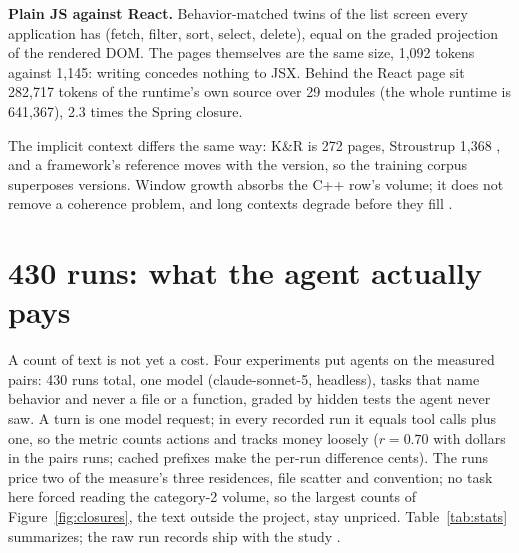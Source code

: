 \documentclass[journal]{IEEEtran}
\begin{document}
\textbf{Plain JS against React.} Behavior-matched twins of the list
screen every application has (fetch, filter, sort, select, delete),
equal on the graded projection of the rendered DOM. The pages
themselves are the same size, 1,092 tokens against 1,145: writing
concedes nothing to JSX. Behind the React page sit 282,717 tokens of
the runtime's own source over 29 modules (the whole runtime is
641,367), 2.3 times the Spring closure.

The implicit context differs the same way: K\&R is 272 pages,
Stroustrup 1,368 \cite{knr,stroustrup}, and a framework's reference
moves with the version, so the training corpus superposes versions.
Window growth absorbs the C++ row's volume; it does not remove a
coherence problem, and long contexts degrade before they fill
\cite{lostmiddle}.

\section*{430 runs: what the agent actually pays}

A count of text is not yet a cost. Four experiments put agents on the
measured pairs: 430 runs total, one model (claude-sonnet-5, headless),
tasks that name behavior and never a file or a function, graded by
hidden tests the agent never saw. A turn is one model request; in every
recorded run it equals tool calls plus one, so the metric counts
actions and tracks money loosely ($r = 0.70$ with dollars in the pairs
runs; cached prefixes make the per-run difference cents). The
runs price two of the measure's three residences, file scatter and
convention; no task here forced reading the category-2 volume, so the
largest counts of Figure~\ref{fig:closures}, the text outside the
project, stay unpriced. Table~\ref{tab:stats} summarizes;
the raw run records ship
with the study \cite{full}.
\end{document}
